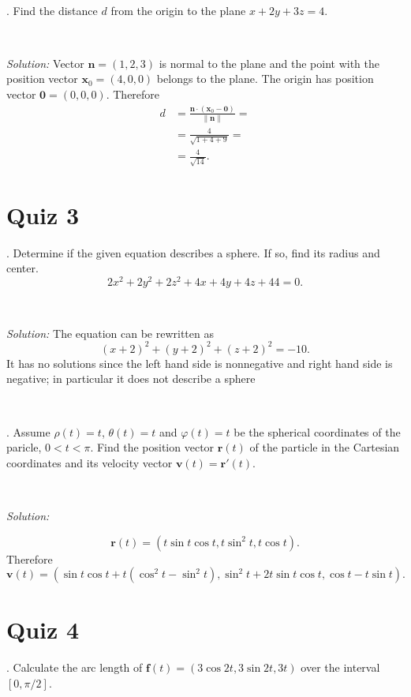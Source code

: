 \documentclass{article}
\def\phi{\varphi}%
\begin{document}
\ 

. 
Find the distance $d$ from the origin to the plane $x+2y+3z=4$.

\ 

\noindent
\textit{Solution:} Vector $\mathbf{n}=(1,2,3)$ is normal to the plane and the point with the position vector $\mathbf{x}_0=(4,0,0)$ belongs to the plane. 
The origin has position vector $\mathbf{0}=(0,0,0)$.
Therefore 
\begin{align*}
d&=\frac{\mathbf{n}\cdot(\mathbf{x}_0-\mathbf{0})}{\|\mathbf{n}\|}=
\\
&=\frac4{\sqrt{1+4+9}}=
\\
&=\frac4{\sqrt{14}}.
\end{align*}

\section*{
Quiz 3
}


. Determine if the given equation describes a sphere. 
If so, find its radius and center.
\[2x^2 + 2y^2 + 2z^2 + 4x + 4y + 4z + 44 = 0.\]


\ 

\noindent
\textit{Solution:} The equation can be rewritten as
\[(x+2)^2+(y+2)^2+(z+2)^2=-10.\]
It has no solutions since the left hand side is nonnegative and right hand side is negative; in particular it does not describe a sphere

\ 


. Assume $\rho(t)=t$, $\theta(t)=t$ and $\phi(t)=t$ be the spherical coordinates of the paricle, $0<t<\pi$. 
Find the position vector $\mathbf{r}(t)$ of the particle in the Cartesian coordinates 
and its velocity vector $\mathbf{v}(t)=\mathbf{r}'(t)$.


\ 

\noindent
\textit{Solution:} 

\[\mathbf{r}(t)=(t\sin t\cos t,t\sin^2 t, t\cos t).\]
Therefore
\[\mathbf{v}(t)=(\sin t\cos t+t(\cos^2t-\sin^2t),\sin^2 t+2t\sin t \cos t, \cos t-t\sin t).\]

\section*{
Quiz 4
}


. Calculate the arc length of $\mathbf{f}(t)=(3\cos 2t, 3\sin 2t, 3t)$ over the  interval $[0,\pi/2]$.



\ 
\end{document}

